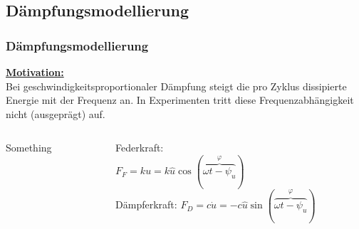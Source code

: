 \subsection{Dämpfungsmodellierung}

\begin{frame}
\frametitle{Dämpfungsmodellierung}
        \textbf{\underline{Motivation:}} \\
        Bei geschwindigkeitsproportionaler Dämpfung steigt die pro Zyklus dissipierte Energie
        mit der Frequenz an. In Experimenten tritt diese Frequenzabhängigkeit nicht (ausgeprägt) auf.
\end{frame}

\begin{frame}
        \begin{columns}
                \begin{column}[t]{.5 \linewidth}
                        Something
                \end{column}

                \begin{column}[t]{.5 \linewidth}
                        Federkraft: \\
                        $F_F = k u = k \hat{u} \cos(\overbrace{\omega t - \psi_u}^\varphi)$ \\
                        Dämpferkraft: 
                        $F_D = c \dot{u} = -c \hat{u} \sin(\overbrace{\omega t - \psi_u}^\varphi)$ \\
                \end{column}
        \end{columns}
\end{frame}

